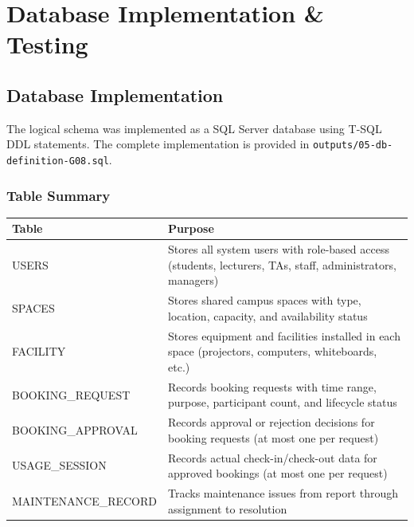 
\section{Database Implementation \& Testing}


\subsection{Database Implementation}

The logical schema was implemented as a SQL Server database using T-SQL DDL statements. The complete implementation is provided in \texttt{outputs/05-db-definition-G08.sql}.

\subsubsection{Table Summary}

\begin{table}[H]
	\centering
	\begin{tabularx}{\textwidth}{|l|X|}
		\hline
		\textbf{Table}      & \textbf{Purpose}                                                                                           \\
		\hline
		USERS               & Stores all system users with role-based access (students, lecturers, TAs, staff, administrators, managers) \\
		\hline
		SPACES              & Stores shared campus spaces with type, location, capacity, and availability status                         \\
		\hline
		FACILITY            & Stores equipment and facilities installed in each space (projectors, computers, whiteboards, etc.)         \\
		\hline
		BOOKING\_REQUEST    & Records booking requests with time range, purpose, participant count, and lifecycle status                 \\
		\hline
		BOOKING\_APPROVAL   & Records approval or rejection decisions for booking requests (at most one per request)                     \\
		\hline
		USAGE\_SESSION      & Records actual check-in/check-out data for approved bookings (at most one per request)                     \\
		\hline
		MAINTENANCE\_RECORD & Tracks maintenance issues from report through assignment to resolution                                     \\
		\hline
	\end{tabularx}
\end{table}

